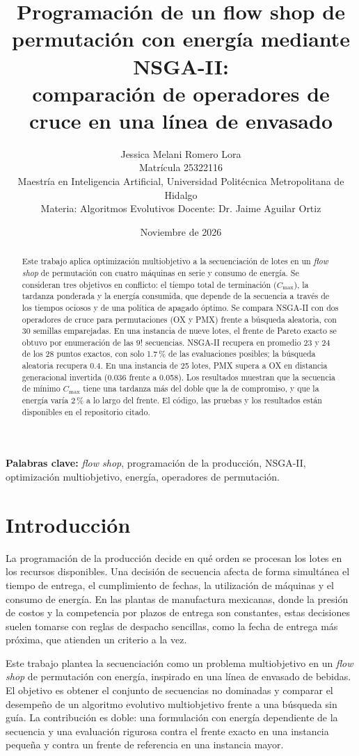 \documentclass[11pt,a4paper]{article}
\title{\textbf{Programación de un flow shop de permutación con energía mediante NSGA-II:\\comparación de operadores de cruce en una línea de envasado}}
\author{Jessica Melani Romero Lora\\
\small Matrícula 25322116 \\
\small Maestría en Inteligencia Artificial, Universidad Politécnica Metropolitana de Hidalgo\\
\small Materia: Algoritmos Evolutivos \quad Docente: Dr. Jaime Aguilar Ortiz}
\date{Noviembre de 2026}
\begin{document}
\maketitle

\begin{abstract}
\noindent Este trabajo aplica optimización multiobjetivo a la secuenciación de lotes en un \emph{flow shop} de permutación con cuatro máquinas en serie y consumo de energía. Se consideran tres objetivos en conflicto: el tiempo total de terminación ($C_{\max}$), la tardanza ponderada y la energía consumida, que depende de la secuencia a través de los tiempos ociosos y de una política de apagado óptimo. Se compara NSGA-II con dos operadores de cruce para permutaciones (OX y PMX) frente a búsqueda aleatoria, con 30 semillas emparejadas. En una instancia de nueve lotes, el frente de Pareto exacto se obtuvo por enumeración de las $9!$ secuencias. NSGA-II recupera en promedio 23 y 24 de los 28 puntos exactos, con solo 1.7\,\% de las evaluaciones posibles; la búsqueda aleatoria recupera 0.4. En una instancia de 25 lotes, PMX supera a OX en distancia generacional invertida (0.036 frente a 0.058). Los resultados muestran que la secuencia de mínimo $C_{\max}$ tiene una tardanza más del doble que la de compromiso, y que la energía varía 2\,\% a lo largo del frente. El código, las pruebas y los resultados están disponibles en el repositorio citado.
\end{abstract}

\noindent\textbf{Palabras clave:} \emph{flow shop}, programación de la producción, NSGA-II, optimización multiobjetivo, energía, operadores de permutación.

\section{Introducción}
La programación de la producción decide en qué orden se procesan los lotes en los recursos disponibles. Una decisión de secuencia afecta de forma simultánea el tiempo de entrega, el cumplimiento de fechas, la utilización de máquinas y el consumo de energía. En las plantas de manufactura mexicanas, donde la presión de costos y la competencia por plazos de entrega son constantes, estas decisiones suelen tomarse con reglas de despacho sencillas, como la fecha de entrega más próxima, que atienden un criterio a la vez.

Este trabajo plantea la secuenciación como un problema multiobjetivo en un \emph{flow shop} de permutación con energía, inspirado en una línea de envasado de bebidas. El objetivo es obtener el conjunto de secuencias no dominadas y comparar el desempeño de un algoritmo evolutivo multiobjetivo frente a una búsqueda sin guía. La contribución es doble: una formulación con energía dependiente de la secuencia y una evaluación rigurosa contra el frente exacto en una instancia pequeña y contra un frente de referencia en una instancia mayor.
\end{document}
